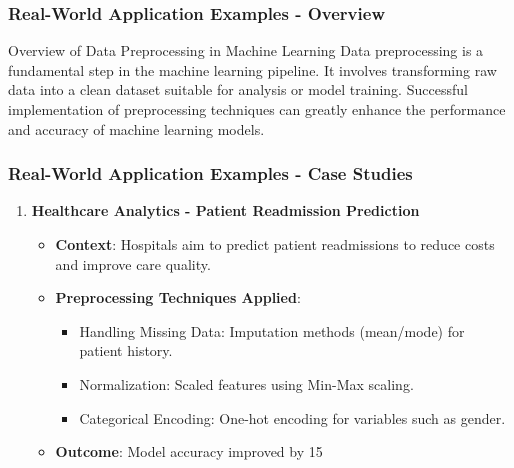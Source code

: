 \documentclass[aspectratio=169]{beamer}
\begin{document}
\begin{frame}[fragile]
    \frametitle{Real-World Application Examples - Overview}
    \begin{block}{Overview of Data Preprocessing in Machine Learning}
        Data preprocessing is a fundamental step in the machine learning pipeline. It involves transforming raw data into a clean dataset suitable for analysis or model training. 
        Successful implementation of preprocessing techniques can greatly enhance the performance and accuracy of machine learning models.
    \end{block}
\end{frame}

\begin{frame}[fragile]
    \frametitle{Real-World Application Examples - Case Studies}
    \begin{enumerate}
        \item \textbf{Healthcare Analytics - Patient Readmission Prediction}
            \begin{itemize}
                \item \textbf{Context}: Hospitals aim to predict patient readmissions to reduce costs and improve care quality.
                \item \textbf{Preprocessing Techniques Applied}:
                    \begin{itemize}
                        \item Handling Missing Data: Imputation methods (mean/mode) for patient history.
                        \item Normalization: Scaled features using Min-Max scaling.
                        \item Categorical Encoding: One-hot encoding for variables such as gender.
                    \end{itemize}
                \item \textbf{Outcome}: Model accuracy improved by 15%
            \end{itemize}
            

\end{enumerate}
\end{frame}
\end{document}
